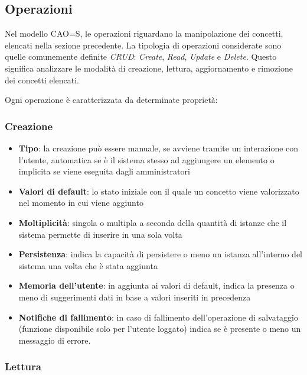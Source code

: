 \documentclass[12pt,italian,]{report}
\providecommand{\tightlist}{%
  \setlength{\itemsep}{0pt}\setlength{\parskip}{0pt}}
\begin{document}
\hypertarget{operazioni}{%
\subsection{Operazioni}\label{operazioni}}

Nel modello CAO=S, le operazioni riguardano la manipolazione dei concetti, elencati nella sezione precedente. La tipologia di operazioni considerate sono quelle comunemente definite \emph{CRUD}: \emph{Create}, \emph{Read}, \emph{Update} e \emph{Delete}. Questo significa analizzare le modalità di creazione, lettura, aggiornamento e rimozione dei concetti elencati.

Ogni operazione è caratterizzata da determinate proprietà:

\subsubsection{Creazione}\label{creazione}

\begin{itemize}
\tightlist
\item
  \textbf{Tipo}: la creazione può essere manuale, se avviene tramite un
  interazione con l'utente, automatica se è il sistema stesso ad
  aggiungere un elemento o implicita se viene eseguita dagli
  amministratori
\item
  \textbf{Valori di default}: lo stato iniziale con il quale un concetto
  viene valorizzato nel momento in cui viene aggiunto
\item
  \textbf{Moltiplicità}: singola o multipla a seconda della quantità di
  istanze che il sistema permette di inserire in una sola volta
\item
  \textbf{Persistenza}: indica la capacità di persistere o meno un
  istanza all'interno del sistema una volta che è stata aggiunta
\item
  \textbf{Memoria dell'utente}: in aggiunta ai valori di default, indica
  la presenza o meno di suggerimenti dati in base a valori inseriti in
  precedenza
\item
  \textbf{Notifiche di fallimento}: in caso di fallimento
  dell'operazione di salvataggio (funzione disponibile solo per l'utente loggato) indica se è presente o meno un
  messaggio di errore.
\end{itemize}

\hypertarget{lettura}{%
\subsubsection{Lettura}\label{lettura}}
\end{document}
